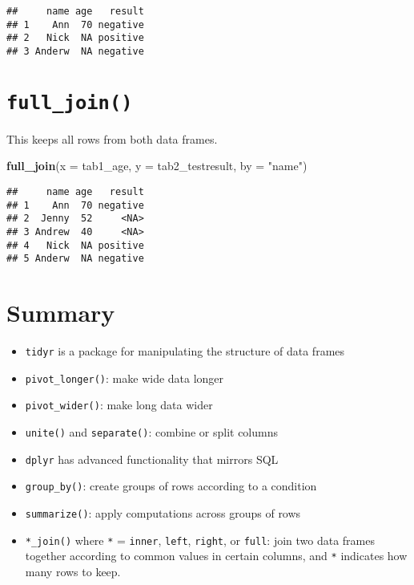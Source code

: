 \documentclass[]{article}
\newenvironment{Shaded}{\begin{snugshade}}{\end{snugshade}}
\newcommand{\DataTypeTok}[1]{\textcolor[rgb]{0.13,0.29,0.53}{#1}}
\newcommand{\KeywordTok}[1]{\textcolor[rgb]{0.13,0.29,0.53}{\textbf{#1}}}
\newcommand{\NormalTok}[1]{#1}
\newcommand{\StringTok}[1]{\textcolor[rgb]{0.31,0.60,0.02}{#1}}
\providecommand{\tightlist}{%
  \setlength{\itemsep}{0pt}\setlength{\parskip}{0pt}}
\begin{document}
\begin{verbatim}
##     name age   result
## 1    Ann  70 negative
## 2   Nick  NA positive
## 3 Anderw  NA negative
\end{verbatim}

\hypertarget{full_join}{%
\section{\texorpdfstring{\texttt{full\_join()}}{full\_join()}}\label{full_join}}

This keeps all rows from both data frames.

\begin{Shaded}
\begin{Highlighting}[]
\KeywordTok{full_join}\NormalTok{(}\DataTypeTok{x =}\NormalTok{ tab1_age, }\DataTypeTok{y =}\NormalTok{ tab2_testresult, }\DataTypeTok{by =} \StringTok{"name"}\NormalTok{)}
\end{Highlighting}
\end{Shaded}

\begin{verbatim}
##     name age   result
## 1    Ann  70 negative
## 2  Jenny  52     <NA>
## 3 Andrew  40     <NA>
## 4   Nick  NA positive
## 5 Anderw  NA negative
\end{verbatim}

\hypertarget{summary}{%
\section{Summary}\label{summary}}

\begin{itemize}
\tightlist
\item
  \texttt{tidyr} is a package for manipulating the structure of data
  frames
\item
  \texttt{pivot\_longer()}: make wide data longer
\item
  \texttt{pivot\_wider()}: make long data wider
\item
  \texttt{unite()} and \texttt{separate()}: combine or split columns
\item
  \texttt{dplyr} has advanced functionality that mirrors SQL
\item
  \texttt{group\_by()}: create groups of rows according to a condition
\item
  \texttt{summarize()}: apply computations across groups of rows
\item
  \texttt{*\_join()} where \texttt{*} = \texttt{inner}, \texttt{left},
  \texttt{right}, or \texttt{full}: join two data frames together
  according to common values in certain columns, and \texttt{*}
  indicates how many rows to keep.
\end{itemize}
\end{document}
